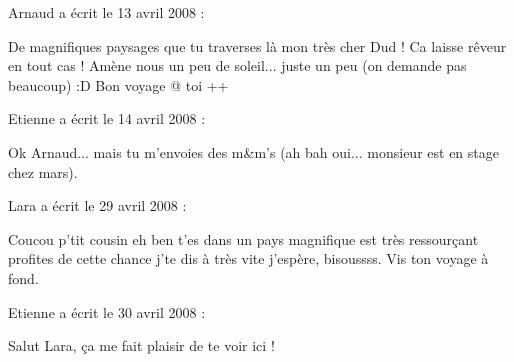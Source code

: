 \medskip
Arnaud a écrit le 13 avril 2008 :
\begin{displayquote}
De magnifiques paysages que tu traverses là mon très cher Dud ! Ca laisse rêveur en tout cas !
Amène nous un peu de soleil... juste un peu (on demande pas beaucoup) :D
Bon voyage @ toi
++
\end{displayquote}

\medskip
Etienne a écrit le 14 avril 2008 :
\begin{displayquote}
Ok Arnaud... mais tu m'envoies des m\&m's (ah bah oui... monsieur est en stage chez mars).
\end{displayquote}

\medskip
Lara a écrit le 29 avril 2008 :
\begin{displayquote}
Coucou p'tit cousin eh ben t'es dans un pays magnifique est très ressourçant profites de cette chance j'te dis à très vite j'espère, bisoussss. Vis ton voyage à fond.
\end{displayquote}

\medskip
Etienne a écrit le 30 avril 2008 :
\begin{displayquote}
Salut Lara, ça me fait plaisir de te voir ici !
\end{displayquote}

\vfill
